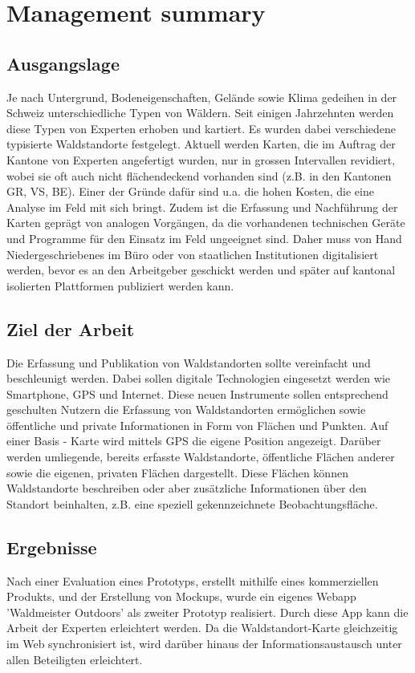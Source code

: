 
\usepackage{float}

\chapter{Management summary}
\section{Ausgangslage}
Je nach Untergrund, Bodeneigenschaften, Gel\"ande sowie Klima gedeihen in der Schweiz unterschiedliche Typen von W\"aldern. Seit einigen Jahrzehnten werden diese Typen von Experten erhoben und kartiert. Es wurden dabei verschiedene typisierte Waldstandorte festgelegt. Aktuell werden Karten, die im Auftrag der Kantone von Experten angefertigt wurden, nur in grossen Intervallen revidiert, wobei sie oft auch nicht fl\"achendeckend vorhanden sind (z.B. in den Kantonen GR, VS, BE).
Einer der Gr\"unde daf\"ur sind u.a. die hohen Kosten, die eine Analyse im Feld mit sich bringt.
Zudem ist die Erfassung und Nachf\"uhrung der Karten gepr\"agt von analogen Vorg\"angen, da die vorhandenen
technischen Ger\"ate und Programme f\"ur den Einsatz im Feld ungeeignet sind.
Daher muss von Hand Niedergeschriebenes im B\"uro oder von staatlichen Institutionen digitalisiert werden, bevor es an den
Arbeitgeber geschickt werden und sp\"ater auf kantonal isolierten Plattformen publiziert werden kann.

\section{Ziel der Arbeit}
Die Erfassung und Publikation von Waldstandorten sollte vereinfacht und beschleunigt werden. Dabei
sollen digitale Technologien eingesetzt werden wie Smartphone, GPS und Internet. Diese neuen
Instrumente sollen entsprechend geschulten Nutzern die Erfassung von Waldstandorten erm\"oglichen sowie \"offentliche und private Informationen in Form von Fl\"achen und Punkten. Auf einer Basis - Karte wird mittels GPS die eigene
Position angezeigt. Dar\"uber werden umliegende, bereits erfasste Waldstandorte, \"offentliche Fl\"achen anderer sowie die eigenen, privaten Fl\"achen dargestellt. Diese Fl\"achen k\"onnen Waldstandorte beschreiben oder aber zus\"atzliche Informationen \"uber den Standort beinhalten, z.B. eine speziell gekennzeichnete Beobachtungsfl\"ache.

\section{Ergebnisse}
Nach einer Evaluation eines Prototyps, erstellt mithilfe eines kommerziellen Produkts,
und der Erstellung von Mockups, wurde ein eigenes Webapp 'Waldmeister Outdoors' als zweiter Prototyp
realisiert. Durch diese App kann die Arbeit der Experten
erleichtert werden. Da die Waldstandort-Karte gleichzeitig im Web synchronisiert
ist, wird dar\"uber hinaus der Informationsaustausch unter allen Beteiligten erleichtert.

